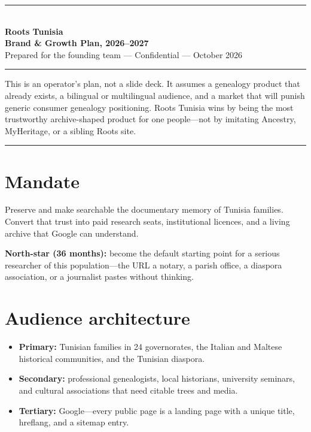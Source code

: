 \documentclass[11pt,a4paper]{article}
\begin{document}
\thispagestyle{empty}
{\color{rule}\rule{\textwidth}{2pt}}\\[0.6em]
{\sffamily\LARGE\bfseries Roots Tunisia \\ Brand \& Growth Plan, 2026--2027}\\[0.4em]
{\sffamily Prepared for the founding team --- Confidential --- October 2026}\\[0.4em]
{\color{rule}\rule{\textwidth}{0.6pt}}

\vspace{1.2em}
\noindent This is an operator's plan, not a slide deck. It assumes a genealogy product that already exists, a bilingual or multilingual audience, and a market that will punish generic consumer genealogy positioning. Roots Tunisia wins by being the most trustworthy archive-shaped product for one people---not by imitating Ancestry, MyHeritage, or a sibling Roots site.

\tableofcontents
\vspace{0.8em}
{\color{rule}\rule{\textwidth}{0.4pt}}

\section{Mandate}
Preserve and make searchable the documentary memory of Tunisia families. Convert that trust into paid research seats, institutional licences, and a living archive that Google can understand.

\textbf{North-star (36 months):} become the default starting point for a serious researcher of this population---the URL a notary, a parish office, a diaspora association, or a journalist pastes without thinking.

\section{Audience architecture}
\begin{itemize}
  \item \textbf{Primary:} Tunisian families in 24 governorates, the Italian and Maltese historical communities, and the Tunisian diaspora.
  \item \textbf{Secondary:} professional genealogists, local historians, university seminars, and cultural associations that need citable trees and media.
  \item \textbf{Tertiary:} Google---every public page is a landing page with a unique title, hreflang, and a sitemap entry.
\end{itemize}
\end{document}
